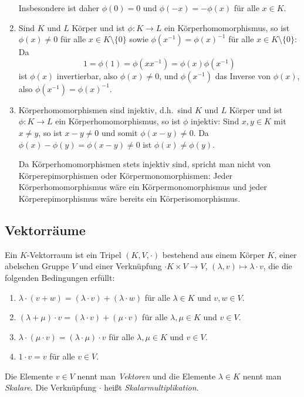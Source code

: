 \begin{bem}
\begin{enumerate}[leftmargin=*]
   Insbesondere ist daher $\phi(0) = 0$ und $\phi(-x) = -\phi(x)$ für alle $x \in K$.
  \item
   Sind $K$ und $L$ Körper und ist $\phi \colon K \to L$ ein Körperhomomorphismus, so ist $\phi(x) \neq 0$ für alle $x \in K \setminus \{0\}$ sowie $\phi(x^{-1}) = \phi(x)^{-1}$ für alle $x \in K \setminus \{0\}$: Da
   \[
    1 = \phi(1) = \phi(x x^{-1}) = \phi(x) \phi(x^{-1})
   \]
   ist $\phi(x)$ invertierbar, also $\phi(x) \neq 0$, und $\phi(x^{-1})$ das Inverse von $\phi(x)$, also $\phi(x^{-1}) = \phi(x)^{-1}$.
  \item
   Körperhomomorphismen sind injektiv, d.h.\ sind $K$ und $L$ Körper und ist $\phi \colon K \to L$ ein Körperhomomorphismus, so ist $\phi$ injektiv: Sind $x, y \in K$ mit $x \neq y$, so ist $x-y \neq 0$ und somit $\phi(x-y) \neq 0$. Da $\phi(x)-\phi(y) = \phi(x-y) \neq 0$ ist $\phi(x) \neq \phi(y)$.
   
   Da Körperhomomorphismen stets injektiv sind, spricht man nicht von Körperepimorphismen oder Körpermonomorphismen: Jeder Körperhomomorphismus wäre ein Körpermonomorphismus und jeder Körperepimorphismus wäre bereits ein Körperisomorphismus.
 \end{enumerate}
\end{bem}





\subsection{Vektorräume}


\begin{defi}
 Ein $K$-Vektorraum ist ein Tripel $(K,V,\cdot)$ bestehend aus einem Körper $K$, einer abelschen Gruppe $V$ und einer Verknüpfung $\cdot K \times V \to V$, $(\lambda, v) \mapsto \lambda \cdot v$, die die folgenden Bedingungen erfüllt:
 \begin{enumerate}[label=\roman*)]
  \item
   $\lambda \cdot (v+w) = (\lambda \cdot v) + (\lambda \cdot w)$ für alle $\lambda \in K$ und $v,w \in V$.
  \item
   $(\lambda + \mu) \cdot v = (\lambda \cdot v) + (\mu \cdot v)$ für alle $\lambda, \mu \in K$ und $v \in V$.
  \item
   $\lambda \cdot (\mu \cdot v) = (\lambda \cdot \mu) \cdot v$ für alle $\lambda, \mu \in K$ und $v \in V$.
  \item
   $1 \cdot v = v$ für alle $v \in V$.
 \end{enumerate}
 Die Elemente $v \in V$ nennt man \emph{Vektoren} und die Elemente $\lambda \in K$ nennt man \emph{Skalare}. Die Verknüpfung $\cdot$ heißt \emph{Skalarmultiplikation}.
\end{defi}



